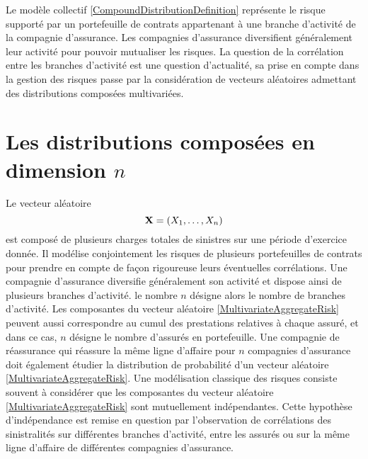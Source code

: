 Le modèle collectif \ref{CompoundDistributionDefinition} représente le risque supporté par un portefeuille de contrats appartenant à une branche d\rq{}activité de la compagnie d\rq{}assurance. Les compagnies d\rq{}assurance diversifient généralement leur activité pour pouvoir mutualiser les risques. La question de la corrélation entre les branches d\rq{}activité est une question d\rq{}actualité, sa prise en compte dans la gestion des risques passe par la considération de vecteurs aléatoires admettant des distributions composées multivariées.    

\section{Les distributions composées en dimension $n$}\label{Chapter1Section2}
Le vecteur aléatoire
\begin{equation}\label{MultivariateAggregateRisk}
\bold{X}=(X_{1},\ldots,X_{n})
\end{equation}
est composé de plusieurs charges totales de sinistres sur une période d\rq{}exercice donnée. Il modélise conjointement les risques de plusieurs portefeuilles de contrats pour prendre en compte de façon rigoureuse leurs éventuelles corrélations. Une compagnie d\rq{}assurance diversifie généralement son activité et dispose ainsi de plusieurs branches d'activité. le nombre $n$ désigne alors le nombre de branches d\rq{}activité. Les composantes du vecteur aléatoire \eqref{MultivariateAggregateRisk} peuvent aussi correspondre au cumul des prestations relatives à chaque assuré, et dans ce cas, $n$ désigne le nombre d\rq{}assurés en portefeuille. Une compagnie de réassurance qui réassure la même ligne d\rq{}affaire pour $n$ compagnies d\rq{}assurance doit également étudier la distribution de probabilité d\rq{}un vecteur aléatoire \eqref{MultivariateAggregateRisk}. Une modélisation classique des risques consiste souvent à considérer que les composantes du vecteur aléatoire \eqref{MultivariateAggregateRisk} sont mutuellement indépendantes. Cette hypothèse d\rq{}indépendance est remise en question par l\rq{}observation de corrélations des sinistralités sur différentes branches d'activité, entre les assurés ou sur la même ligne d\rq{}affaire de différentes compagnies d\rq{}assurance.\\ 

